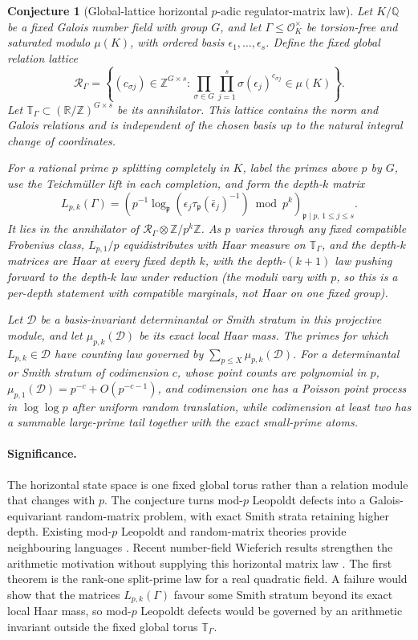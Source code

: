 \documentclass[11pt]{article}
\newtheorem{conjecture}{Conjecture}
\theoremstyle{definition}
\newcommand{\Z}{\mathbb Z}
\newcommand{\Q}{\mathbb Q}
\newcommand{\R}{\mathbb R}
\providecommand{\Z}{\mathbb Z}
\providecommand{\Q}{\mathbb Q}
\providecommand{\R}{\mathbb R}
\begin{document}
\begin{conjecture}[Global-lattice horizontal $p$-adic regulator-matrix law]\label{s14}
Let $K/\Q$ be a fixed Galois number field with group $G$, and let
$\Gamma\le\mathcal O_K^\times$ be torsion-free and saturated modulo $\mu(K)$, with ordered basis
$\epsilon_1,\ldots,\epsilon_s$.  Define the fixed global relation lattice
\[
 \mathcal R_\Gamma=
 \left\{(c_{\sigma j})\in\Z^{G\times s}:
   \prod_{\sigma\in G}\prod_{j=1}^s
   \sigma(\epsilon_j)^{c_{\sigma j}}\in\mu(K)\right\}.
\]
Let $\mathbb T_\Gamma\subset(\R/\Z)^{G\times s}$ be its annihilator.  This lattice
contains the norm and Galois relations and is independent of the chosen basis up to the
natural integral change of coordinates.

For a rational prime $p$ splitting completely in $K$, label the primes above $p$ by
$G$, use the Teichm\"uller lift in each completion, and form the depth-$k$ matrix
\[
 L_{p,k}(\Gamma)=
 \left(p^{-1}\log_{\mathfrak p}
   (\epsilon_j\tau_{\mathfrak p}(\bar\epsilon_j)^{-1})
   \bmod p^k\right)_{\mathfrak p\mid p,\,1\le j\le s}.
\]
It lies in the annihilator of
$\mathcal R_\Gamma\otimes\Z/p^k\Z$.  As $p$ varies through any fixed compatible
Frobenius class, $L_{p,1}/p$ equidistributes with Haar measure on
$\mathbb T_\Gamma$, and the depth-$k$ matrices are Haar at every fixed depth $k$, with the depth-$(k+1)$ law pushing forward to the depth-$k$ law under reduction (the moduli vary with $p$, so this is a per-depth statement with compatible marginals, not Haar on one fixed group).

Let $\mathcal D$ be a basis-invariant determinantal or Smith stratum in this projective
module, and let $\mu_{p,k}(\mathcal D)$ be its exact local Haar mass.  The primes for
which $L_{p,k}\in\mathcal D$ have counting law governed by
$\sum_{p\le X}\mu_{p,k}(\mathcal D)$.  For a determinantal or Smith stratum of codimension $c$, whose point counts are polynomial in $p$, $\mu_{p,1}(\mathcal D)=p^{-c}+O(p^{-c-1})$, and codimension one has a Poisson point process
in $\log\log p$ after uniform random translation, while codimension at least two has a
summable large-prime tail together with the exact small-prime atoms.
\end{conjecture}

\paragraph{Significance.}
The horizontal state space is one fixed global torus rather than a relation module that
changes with $p$.  The conjecture turns mod-$p$ Leopoldt defects into a Galois-equivariant
random-matrix problem, with exact Smith strata retaining higher depth.  Existing
mod-$p$ Leopoldt and random-matrix theories provide neighbouring languages
\cite{BGKK,WangStanley,VanPeski}.  Recent number-field Wieferich results strengthen the
arithmetic motivation without supplying this horizontal matrix law
\cite{FelliniMurty,LiZhao}.  The first theorem is the rank-one split-prime law for a real quadratic field. A failure would show that the matrices $L_{p,k}(\Gamma)$ favour some Smith stratum beyond its exact local Haar mass, so mod-$p$ Leopoldt defects would be governed by an arithmetic invariant outside the fixed global torus $\mathbb T_\Gamma$.
\end{document}

